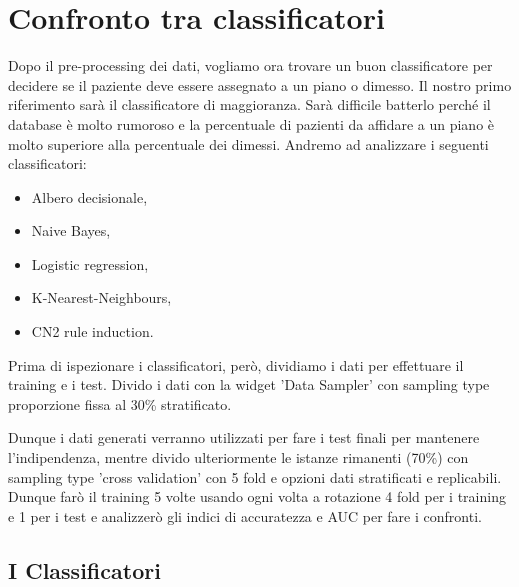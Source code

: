 \documentclass[a4paper, 12p]{report}
\begin{document}
\chapter{Confronto tra classificatori}
Dopo il pre-processing dei dati, vogliamo ora trovare un buon classificatore per decidere se il paziente deve essere assegnato a un piano o dimesso. Il nostro primo riferimento sarà il classificatore di maggioranza. Sarà difficile batterlo perché il database è molto rumoroso e la percentuale di pazienti da affidare a un piano è molto superiore alla percentuale dei dimessi.
Andremo ad analizzare i seguenti classificatori:
\begin{itemize}
	\item Albero decisionale,
	\item Naive Bayes,
	\item Logistic regression,
	\item K-Nearest-Neighbours,
	\item CN2 rule induction.
\end{itemize}		
	Prima di ispezionare i classificatori, però, dividiamo i dati per effettuare il training e i test. Divido i dati con la widget 'Data Sampler' con sampling type proporzione fissa al 30\% stratificato. 
	
	Dunque i dati generati verranno utilizzati per fare i test finali per mantenere l'indipendenza, mentre divido ulteriormente le istanze rimanenti (70\%) con sampling type 'cross validation' con 5 fold e opzioni dati stratificati e replicabili. Dunque farò il training 5 volte usando ogni volta a rotazione 4 fold per i training e 1 per i test e analizzerò gli indici di accuratezza e AUC per fare i confronti.
	
	\section{I Classificatori}
\end{document}
